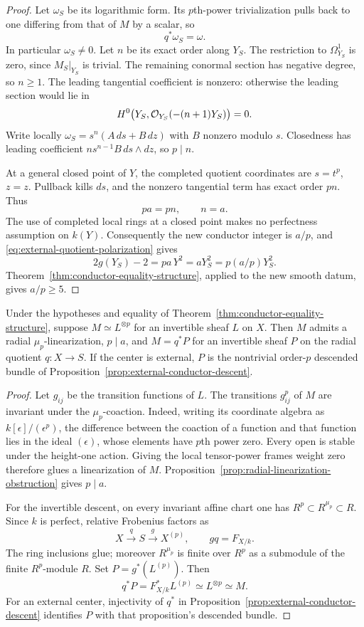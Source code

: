 \begin{proof}
Let $\omega_S$ be its logarithmic form. Its $p$th-power
trivialization pulls back to one differing from that of $M$
by a scalar, so
\begin{equation}\label{eq:descended-logarithmic-form}
 q^*\omega_S=\omega.
\end{equation}
In particular $\omega_S\ne0$.
Let $n$ be its exact order along $Y_S$. The restriction to
$\Omega^1_{Y_S}$ is zero, since $M_S|_{Y_S}$ is trivial.
The remaining conormal section has negative degree, so $n\geq1$.
The leading tangential coefficient is nonzero: otherwise the
leading section would lie in
\[
 H^0\bigl(Y_S,\mathcal O_{Y_S}(-(n+1)Y_S)\bigr)=0.
\]
Write locally $\omega_S=s^n(A\,ds+B\,dz)$ with $B$ nonzero
modulo $s$. Closedness has leading coefficient
$n s^{n-1}B\,ds\wedge dz$, so $p\mid n$.

At a general closed point of $Y$, the completed quotient
coordinates are $s=t^p$, $z=z$. Pullback kills $ds$, and the
nonzero tangential term has exact order $pn$. Thus
\[
 pa=pn,\qquad n=a.
\]
The use of completed local rings at a closed point makes no
perfectness assumption on $k(Y)$.
Consequently the new conductor integer is $a/p$, and
\eqref{eq:external-quotient-polarization} gives
\[
 2g(Y_S)-2=pa\,Y^2=aY_S^2=p(a/p)Y_S^2.
\]
Theorem~\ref{thm:conductor-equality-structure}, applied to the new
smooth datum, gives $a/p\geq5$.
\end{proof}

\begin{lemma}\label{lem:radial-power-descent}
Under the hypotheses and equality of
Theorem~\ref{thm:conductor-equality-structure}, suppose
$M\simeq L^{\otimes p}$ for an invertible sheaf $L$ on $X$.
Then $M$ admits a radial $\mu_p$-linearization, $p\mid a$,
and $M=q^*P$ for an invertible sheaf $P$ on the radial quotient
$q:X\to S$. If the center is external, $P$ is the nontrivial
order-$p$ descended bundle of
Proposition~\ref{prop:external-conductor-descent}.
\end{lemma}

\begin{proof}
Let $g_{ij}$ be the transition functions of $L$.
The transitions $g_{ij}^p$ of $M$ are invariant under the
$\mu_p$-coaction. Indeed, writing its coordinate algebra as
$k[\epsilon]/(\epsilon^p)$, the difference between the coaction
of a function and that function lies in the ideal $(\epsilon)$,
whose elements have $p$th power zero.
Every open is stable under the height-one action.
Giving the local tensor-power frames weight zero therefore
glues a linearization of $M$.
Proposition~\ref{prop:radial-linearization-obstruction} gives
$p\mid a$.

For the invertible descent, on every invariant affine chart
one has $R^p\subset R^{\mu_p}\subset R$.
Since $k$ is perfect, relative Frobenius factors as
\[
 X\xrightarrow{q}S\xrightarrow{g}X^{(p)},
 \qquad gq=F_{X/k}.
\]
The ring inclusions glue; moreover $R^{\mu_p}$ is finite over
$R^p$ as a submodule of the finite $R^p$-module $R$.
Set $P=g^*(L^{(p)})$. Then
\[
 q^*P=F_{X/k}^*L^{(p)}\simeq L^{\otimes p}\simeq M.
\]
For an external center, injectivity of $q^*$ in
Proposition~\ref{prop:external-conductor-descent} identifies
$P$ with that proposition's descended bundle.
\end{proof}

